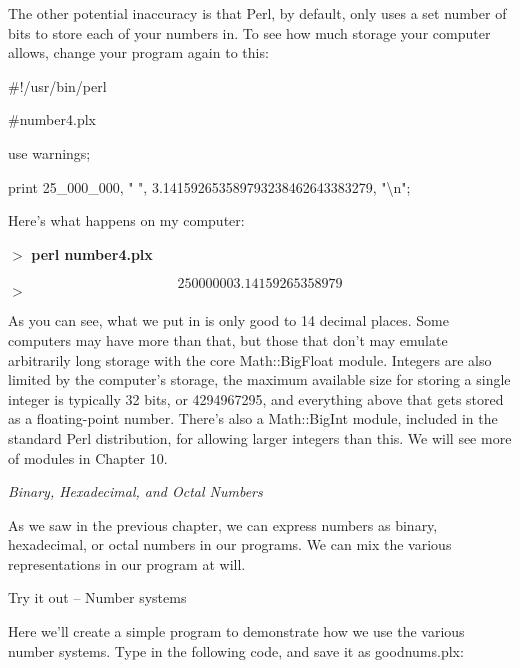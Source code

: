 \documentclass[a4paper,11pt]{book}
\begin{document}
\noindent 

\noindent The other potential inaccuracy is that Perl, by default, only uses a set number of bits to store each of your numbers in. To see how much storage your computer allows, change your program again to this:

\noindent 

\noindent 

\noindent \#!/usr/bin/perl

\noindent \#number4.plx

\noindent use warnings;

\noindent print 25\_000\_000, " ", 3.141592653589793238462643383279, "\textbackslash n";

\noindent 

\noindent Here's what happens on my computer:

\noindent 

\noindent $>$ \textbf{perl number4.plx}

\[25000000 3.14159265358979\] 
$>$

\noindent 

\noindent As you can see, what we put in is only good to 14 decimal places. Some computers may have more than that, but those that don't may emulate arbitrarily long storage with the core Math::BigFloat module. Integers are also limited by the computer's storage, the maximum available size for storing a single  integer is typically 32 bits, or 4294967295, and everything above that gets stored as a floating-point number. There's also a Math::BigInt module, included in the standard Perl distribution, for allowing larger integers than this. We will see more of modules in Chapter 10.

\noindent 

\noindent \textit{Binary, Hexadecimal, and Octal Numbers}

\noindent As we saw in the previous chapter, we can express numbers as binary, hexadecimal, or octal numbers in our programs. We can mix the various representations in our program at will.

\noindent 

\noindent 

\noindent Try it out -- Number systems

\noindent Here we'll create a simple program to demonstrate how we use the various number systems. Type in the following code, and save it as goodnums.plx:

\noindent 

\noindent 
\end{document}
